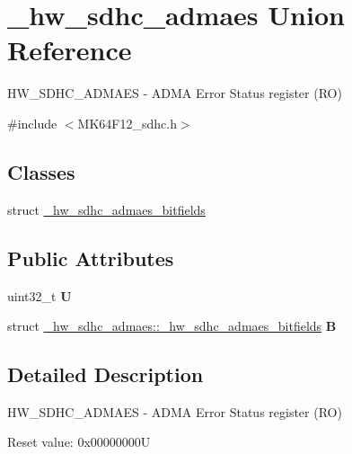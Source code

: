 \hypertarget{union__hw__sdhc__admaes}{}\section{\+\_\+hw\+\_\+sdhc\+\_\+admaes Union Reference}
\label{union__hw__sdhc__admaes}


H\+W\+\_\+\+S\+D\+H\+C\+\_\+\+A\+D\+M\+A\+ES -\/ A\+D\+MA Error Status register (RO)  




{\ttfamily \#include $<$M\+K64\+F12\+\_\+sdhc.\+h$>$}

\subsection*{Classes}
\begin{DoxyCompactItemize}
\item 
struct \hyperlink{struct__hw__sdhc__admaes_1_1__hw__sdhc__admaes__bitfields}{\+\_\+hw\+\_\+sdhc\+\_\+admaes\+\_\+bitfields}
\end{DoxyCompactItemize}
\subsection*{Public Attributes}
\begin{DoxyCompactItemize}
\item 
uint32\+\_\+t {\bfseries U}\hypertarget{union__hw__sdhc__admaes_a741bede5540d4ab8faab3e58840e38b0}{}\label{union__hw__sdhc__admaes_a741bede5540d4ab8faab3e58840e38b0}

\item 
struct \hyperlink{struct__hw__sdhc__admaes_1_1__hw__sdhc__admaes__bitfields}{\+\_\+hw\+\_\+sdhc\+\_\+admaes\+::\+\_\+hw\+\_\+sdhc\+\_\+admaes\+\_\+bitfields} {\bfseries B}\hypertarget{union__hw__sdhc__admaes_a394d0561e1ab1525e188d39ede3b7d27}{}\label{union__hw__sdhc__admaes_a394d0561e1ab1525e188d39ede3b7d27}

\end{DoxyCompactItemize}


\subsection{Detailed Description}
H\+W\+\_\+\+S\+D\+H\+C\+\_\+\+A\+D\+M\+A\+ES -\/ A\+D\+MA Error Status register (RO) 

Reset value\+: 0x00000000U

